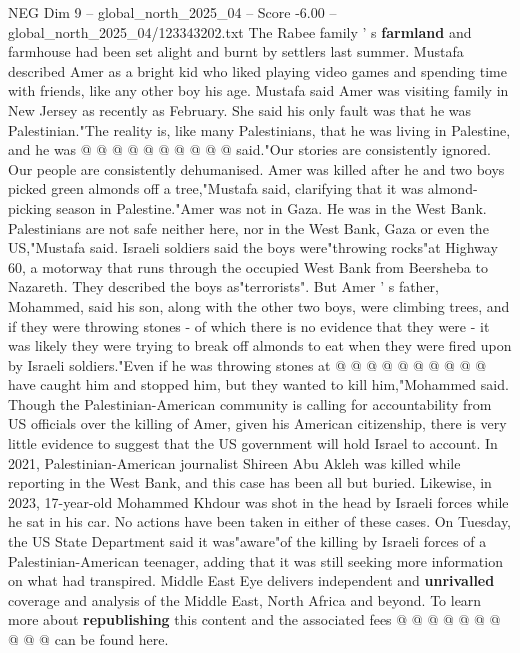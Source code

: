 \begin{textsample}{NEG Dim 9 – global\_north\_2025\_04 – Score -6.00 – global\_north\_2025\_04/123343202.txt}
The Rabee family ' s \textbf{farmland} and farmhouse had been set alight and burnt by settlers last summer.
Mustafa described Amer as a bright kid who liked playing video games and spending time with friends, like any other boy his age.
Mustafa said Amer was visiting family in New Jersey as recently as February.
She said his only fault was that he was Palestinian."The reality is, like many Palestinians, that he was living in Palestine, and he was @ @ @ @ @ @ @ @ @ @ said."Our stories are consistently ignored.
Our people are consistently dehumanised.
Amer was killed after he and two boys picked green almonds off a tree,"Mustafa said, clarifying that it was almond-picking season in Palestine."Amer was not in Gaza.
He was in the West Bank.
Palestinians are not safe neither here, nor in the West Bank, Gaza or even the US,"Mustafa said.
Israeli soldiers said the boys were"throwing rocks"at Highway 60, a motorway that runs through the occupied West Bank from Beersheba to Nazareth.
They described the boys as"terrorists".
But Amer ' s father, Mohammed, said his son, along with the other two boys, were climbing trees, and if they were throwing stones - of which there is no evidence that they were - it was likely they were trying to break off almonds to eat when they were fired upon by Israeli soldiers."Even if he was throwing stones at @ @ @ @ @ @ @ @ @ @ have caught him and stopped him, but they wanted to kill him,"Mohammed said.
Though the Palestinian-American community is calling for accountability from US officials over the killing of Amer, given his American citizenship, there is very little evidence to suggest that the US government will hold Israel to account.
In 2021, Palestinian-American journalist Shireen Abu Akleh was killed while reporting in the West Bank, and this case has been all but buried.
Likewise, in 2023, 17-year-old Mohammed Khdour was shot in the head by Israeli forces while he sat in his car.
No actions have been taken in either of these cases.
On Tuesday, the US State Department said it was"aware"of the killing by Israeli forces of a Palestinian-American teenager, adding that it was still seeking more information on what had transpired.
Middle East Eye delivers independent and \textbf{unrivalled} coverage and analysis of the Middle East, North Africa and beyond.
To learn more about \textbf{republishing} this content and the associated fees @ @ @ @ @ @ @ @ @ @ can be found here.

\end{textsample}
